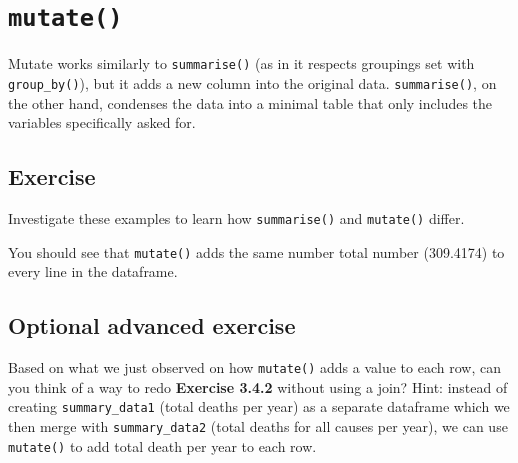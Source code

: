\documentclass[]{book}
\makeatletter
\newenvironment{Shaded}{\begin{snugshade}}{\end{snugshade}}
\newcommand{\KeywordTok}[1]{\textcolor[rgb]{0.13,0.29,0.53}{\textbf{#1}}}
\newcommand{\DataTypeTok}[1]{\textcolor[rgb]{0.13,0.29,0.53}{#1}}
\newcommand{\StringTok}[1]{\textcolor[rgb]{0.31,0.60,0.02}{#1}}
\newcommand{\OperatorTok}[1]{\textcolor[rgb]{0.81,0.36,0.00}{\textbf{#1}}}
\newcommand{\NormalTok}[1]{#1}
\newenvironment{kframe}{%
\medskip{}
\setlength{\fboxsep}{.8em}
 \def\at@end@of@kframe{}%
 \ifinner\ifhmode%
  \def\at@end@of@kframe{\end{minipage}}%
  \begin{minipage}{\columnwidth}%
 \fi\fi%
 \def\FrameCommand##1{\hskip\@totalleftmargin \hskip-\fboxsep
 \colorbox{shadecolor}{##1}\hskip-\fboxsep
     \hskip-\linewidth \hskip-\@totalleftmargin \hskip\columnwidth}%
 \MakeFramed {\advance\hsize-\width
   \@totalleftmargin\z@ \linewidth\hsize
   \@setminipage}}%
 {\par\unskip\endMakeFramed%
 \at@end@of@kframe}
\renewenvironment{Shaded}{\begin{kframe}}{\end{kframe}}
\makeatother
\begin{document}
\section{\texorpdfstring{\texttt{mutate()}}{mutate()}}\label{mutate}

Mutate works similarly to \texttt{summarise()} (as in it respects
groupings set with \texttt{group\_by()}), but it adds a new column into
the original data. \texttt{summarise()}, on the other hand, condenses
the data into a minimal table that only includes the variables
specifically asked for.

\subsection{Exercise}\label{exercise-18}

Investigate these examples to learn how \texttt{summarise()} and
\texttt{mutate()} differ.

\begin{Shaded}
\end{Shaded}

You should see that \texttt{mutate()} adds the same number total number
(309.4174) to every line in the dataframe.

\subsection{Optional advanced
exercise}\label{optional-advanced-exercise}

Based on what we just observed on how \texttt{mutate()} adds a value to
each row, can you think of a way to redo \textbf{Exercise 3.4.2} without
using a join? Hint: instead of creating \texttt{summary\_data1} (total
deaths per year) as a separate dataframe which we then merge with
\texttt{summary\_data2} (total deaths for all causes per year), we can
use \texttt{mutate()} to add total death per year to each row.
\end{document}
